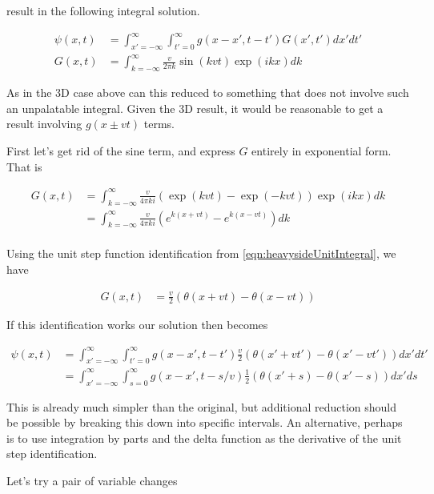 \documentclass{article}
\begin{document}
result in the following integral solution.

\begin{align}\label{eqn:oneDimResult}
{\psi}(x, t)
&=
\int_{x'=-\infty}^\infty
\int_{t' = 0}^\infty {g}(x-x', t-t') G(x', t') dx' dt' \\
G(x, t) &=
\int_{k = -\infty}^\infty
\frac{v}{2\pi {k}}
\sin( {k} v t )
\exp( i k x )
dk
\end{align}

As in the 3D case above can this reduced to something that does not involve such an unpalatable integral.
Given the 3D result, it would be reasonable to get a result involving $g(x \pm vt)$ terms.

First let's get rid of the sine term, and express $G$ entirely in exponential form.  That is

\begin{align*}
G(x, t)
&=
\int_{k = -\infty}^\infty
\frac{v}{4\pi k i }
\left(\exp( {k} v t ) -\exp( -{k} v t )\right) \exp( i k x )
dk \\
&=
\int_{k = -\infty}^\infty
\frac{v}{4\pi k i }
\left(e^{ {k} (x + v t ) } - e^{ {k} (x - v t) }\right) 
dk \\
\end{align*}

Using the unit step function identification from \ref{eqn:heavysideUnitIntegral}, we have

\begin{align}
G(x, t) &= \frac{v}{2} \left(\theta(x + v t )  - \theta(x - v t) \right) 
\end{align}

If this identification works our solution then becomes

\begin{align*}
{\psi}(x, t)
&=
\int_{x'=-\infty}^\infty
\int_{t'= 0}^\infty
{g}(x-x', t-t')
\frac{v}{2} \left(\theta(x' + v t' )  - \theta(x' - v t') \right) 
dx' dt' \\
&=
\int_{x'=-\infty}^\infty
\int_{s= 0}^\infty
{g}(x-x', t-s/v)
\frac{1}{2} \left(\theta(x' + s )  - \theta(x' - s) \right) 
dx' ds
\end{align*}

This is already much simpler than the original, but additional reduction should be possible by breaking this down into specific intervals.  An
alternative, perhaps is to use integration by parts and the delta function as the derivative of the unit step identification.

Let's try a pair of variable changes
\end{document}
